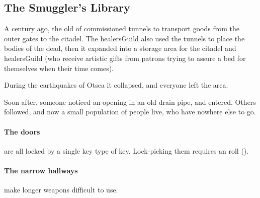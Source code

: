 \subsection[Smuggler's Library]{The Smuggler's Library}
\label{sewers}

A century ago, the old  of  commissioned tunnels to transport goods from the outer gates to the citadel.
The \gls{healersGuild} also used the tunnels to place the bodies of the dead, then it expanded into a storage area for the citadel and \gls{healersGuild} (who receive artistic gifts from patrons trying to assure a bed for themselves when their time comes).

During the earthquakes of Otsea%
it collapsed, and everyone left the area.

Soon after, someone noticed an opening in an old drain pipe, and entered.
Others followed, and now a small population of people live, who have nowhere else to go.

\paragraph{The doors} are all locked by a single key type of key.
Lock-picking them requires an  roll (\tn[10]).

\paragraph{The narrow hallways}
make longer weapons difficult to use.%


